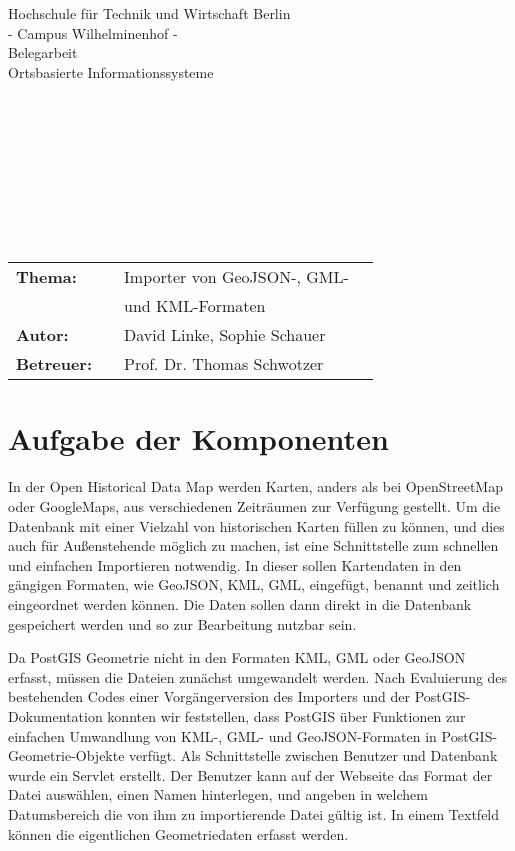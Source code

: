\documentclass[]{article}
\begin{document}
\begin{center}
\Large{Hochschule für Technik und Wirtschaft Berlin}\\
\Large{- Campus Wilhelminenhof -}\\
\Large{Belegarbeit}\\
\Large{Ortsbasierte Informationssysteme}\\
\begin{verbatim}










\end{verbatim}
\begin{tabular}{llll}
\textbf{Thema: } & & Importer von GeoJSON-, GML- \\
&& und KML-Formaten& \\
\textbf{Autor:} & & David Linke, Sophie Schauer & \\
\textbf{Betreuer:} & & Prof. Dr. Thomas Schwotzer &\\
\end{tabular}
\end{center}
\pagebreak

\section{Aufgabe der Komponenten}
In der Open Historical Data Map werden Karten, anders als bei OpenStreetMap oder GoogleMaps, aus verschiedenen Zeiträumen zur Verfügung gestellt. Um die Datenbank mit einer Vielzahl von historischen Karten füllen zu können, und dies auch für Außenstehende möglich zu machen, ist eine Schnittstelle zum schnellen und einfachen Importieren notwendig. In dieser sollen Kartendaten in den gängigen Formaten, wie GeoJSON, KML, GML, eingefügt, benannt und zeitlich eingeordnet werden können. Die Daten sollen dann direkt in die Datenbank gespeichert werden und so zur Bearbeitung nutzbar sein.

Da PostGIS Geometrie nicht in den Formaten KML, GML oder GeoJSON erfasst, müssen die Dateien zunächst umgewandelt werden. Nach Evaluierung des bestehenden Codes einer Vorgängerversion des Importers und der PostGIS-Dokumentation konnten wir feststellen, dass PostGIS über Funktionen zur einfachen Umwandlung von KML-, GML- und GeoJSON-Formaten in PostGIS-Geometrie-Objekte verfügt. Als Schnittstelle zwischen Benutzer und Datenbank wurde ein Servlet erstellt. Der Benutzer kann auf der Webseite das Format der Datei auswählen, einen Namen hinterlegen, und angeben in welchem Datumsbereich die von ihm zu importierende Datei gültig ist. In einem Textfeld können die eigentlichen Geometriedaten erfasst werden.
\end{document}
